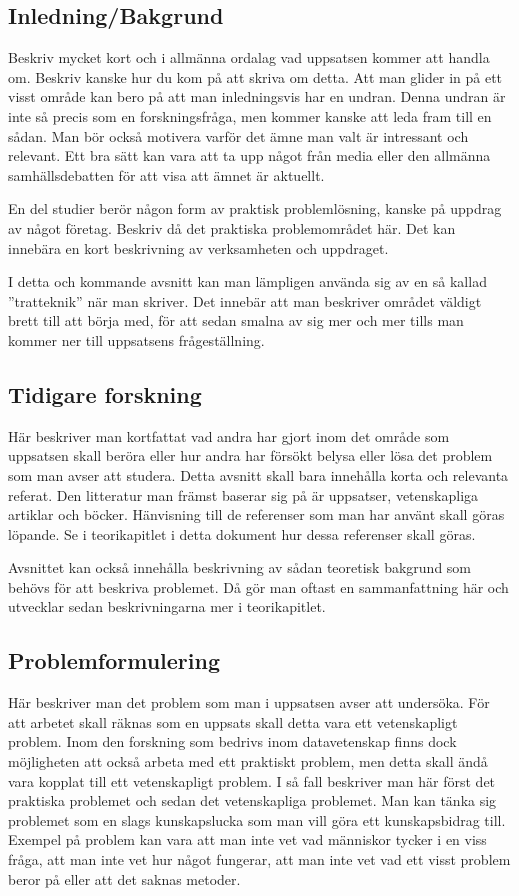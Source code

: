 \documentclass[a4paper,12pt]{article} %
\begin{document}
\subsection{Inledning/Bakgrund}
Beskriv mycket kort och i allmänna ordalag vad uppsatsen kommer att handla om. Beskriv kanske hur du kom på att skriva om detta. Att man glider in på ett visst område kan bero på att man inledningsvis har en undran. Denna undran är inte så precis som en forskningsfråga, men kommer kanske att leda fram till en sådan. Man bör också motivera varför det ämne man valt är intressant och relevant. Ett bra sätt kan vara att ta upp något från media eller den allmänna samhällsdebatten för att visa att ämnet är aktuellt.

En del studier berör någon form av praktisk problemlösning, kanske på uppdrag av något företag. Beskriv då det praktiska problemområdet här. Det kan innebära en kort beskrivning av verksamheten och uppdraget.

I detta och kommande avsnitt kan man lämpligen använda sig av en så kallad ”tratteknik” när man skriver. Det innebär att man beskriver området väldigt brett till att börja med, för att sedan smalna av sig mer och mer tills man kommer ner till uppsatsens frågeställning. 

\subsection{Tidigare forskning}
Här beskriver man kortfattat vad andra har gjort inom det område som uppsatsen skall beröra eller hur andra har försökt belysa eller lösa det problem som man avser att studera. Detta avsnitt skall bara innehålla korta och relevanta referat. Den litteratur man främst baserar sig på är uppsatser, vetenskapliga artiklar och böcker. Hänvisning till de referenser som man har använt skall göras löpande. Se i teorikapitlet i detta dokument hur dessa referenser skall göras. 

Avsnittet kan också innehålla beskrivning av sådan teoretisk bakgrund som behövs för att beskriva problemet. Då gör man oftast en sammanfattning här och utvecklar sedan beskrivningarna mer i teorikapitlet. 

\subsection{Problemformulering}
Här beskriver man det problem som man i uppsatsen avser att undersöka. För att arbetet skall räknas som en uppsats skall detta vara ett vetenskapligt problem. Inom den forskning som bedrivs inom datavetenskap finns dock möjligheten att också arbeta med ett praktiskt problem, men detta skall ändå vara kopplat till ett vetenskapligt problem. I så fall beskriver man här först det praktiska problemet och sedan det vetenskapliga problemet. Man kan tänka sig problemet som en slags kunskapslucka som man vill göra ett kunskapsbidrag till. Exempel på problem kan vara att man inte vet vad människor tycker i en viss fråga, att man inte vet hur något fungerar, att man inte vet vad ett visst problem beror på eller att det saknas metoder.
\end{document}
